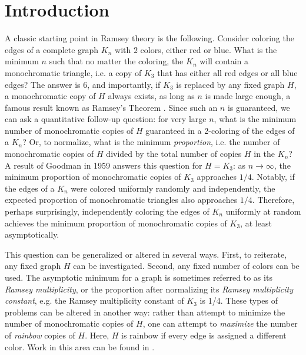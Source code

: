 \section{Introduction}

A classic starting point in Ramsey theory is the following.
Consider coloring the edges of a complete graph $K_n$ with $2$ colors, either red or blue.
What is the minimum $n$ such that no matter the coloring, the $K_n$ 
will contain a monochromatic triangle, i.e. a copy of $K_3$ that 
has either all red edges or all blue edges?
The answer is $6$, and importantly, if $K_3$ is replaced by any fixed graph $H$,
a monochromatic copy of $H$ always exists, as long as $n$ is made large enough,
a famous result known as Ramsey's Theorem \cite{R1928}. 
Since such an $n$ is guaranteed, we can ask a quantitative follow-up question:
for very large $n$, what is the minimum number of monochromatic copies of $H$ guaranteed
in a 2-coloring of the edges of a $K_n$?
Or, to normalize, what is the minimum \textit{proportion},
i.e. the number of monochromatic copies of $H$ divided by the total number of copies $H$ in the $K_n$?
A result of Goodman \cite{G1959} in 1959 answers this question for $H = K_3$:
as $n \to \infty$, the minimum proportion of monochromatic copies of $K_3$ approaches $1/4$.
Notably, if the edges of a $K_n$ were colored uniformly randomly and independently,
the expected proportion of monochromatic triangles also approaches $1/4$.
Therefore, perhaps surprisingly, independently coloring the edges of $K_n$ uniformly at random achieves the minimum proportion of 
monochromatic copies of $K_3$, at least asymptotically.

This question can be generalized or altered in several ways. First, to reiterate, any fixed graph $H$ can be investigated.
Second, any fixed number of colors can be used.
The asymptotic minimum for a graph is sometimes referred to as its \textit{Ramsey multiplicity}, or the proportion after normalizing its \textit{Ramsey multiplicity constant}, e.g. the Ramsey multiplicity constant of $K_3$ is 1/4.
These types of problems can be altered in another way: rather than attempt to minimize
the number of monochromatic copies of $H$, one can attempt to \textit{maximize} the number of \textit{rainbow} copies of $H$.
Here, $H$ is rainbow if every edge is assigned a different color.
Work in this area can be found in \cite{B2024, D2018, S2023}.


